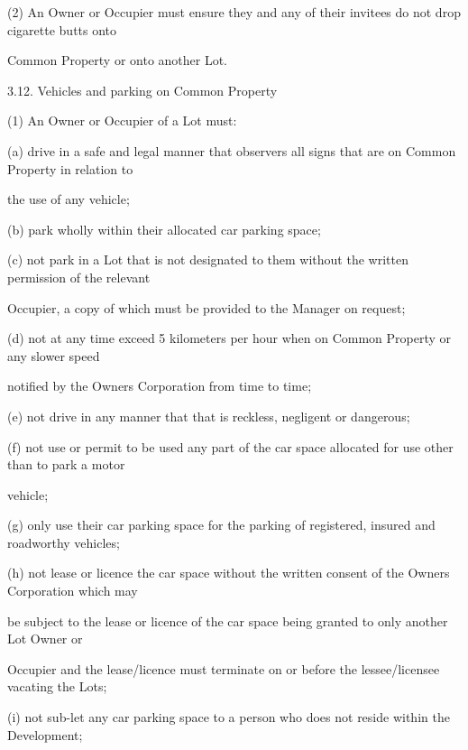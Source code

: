 \documentclass{article}
\begin{document}
{\fontsize{9.962}{1}(2) An Owner or Occupier must ensure they and any of their invitees do not drop cigarette butts onto }

{\fontsize{10.02}{1}Common Property or onto another Lot. }

{\fontsize{9.99}{1}3.12. Vehicles and parking on Common Property }

{\fontsize{9.962}{1}(1) An Owner or Occupier of a Lot must: }

{\fontsize{9.962}{1}(a) drive in a safe and legal manner that observers all signs that are on Common Property in relation to }

{\fontsize{10.02}{1}the use of any vehicle; }

{\fontsize{9.962}{1}(b) park wholly within their allocated car parking space; }

{\fontsize{9.962}{1}(c) not park in a Lot that is not designated to them without the written permission of the relevant }

{\fontsize{10.02}{1}Occupier, a copy of which must be provided to the Manager on request; }

{\fontsize{9.962}{1}(d) not at any time exceed 5 kilometers per hour when on Common Property or any slower speed }

{\fontsize{10.02}{1}notified by the Owners Corporation from time to time; }

{\fontsize{9.962}{1}(e) not drive in any manner that that is reckless, negligent or dangerous; }

{\fontsize{9.962}{1}(f) not use or permit to be used any part of the car space allocated for use other than to park a motor }

{\fontsize{10.02}{1}vehicle; }

{\fontsize{9.962}{1}(g) only use their car parking space for the parking of registered, insured and roadworthy vehicles; }

{\fontsize{9.962}{1}(h) not lease or licence the car space without the written consent of the Owners Corporation which may }

{\fontsize{10.02}{1}be subject to the lease or licence of the car space being granted to only another Lot Owner or }

{\fontsize{10.02}{1}Occupier and the lease/licence must terminate on or before the lessee/licensee vacating the Lots; }

{\fontsize{9.962}{1}(i) not sub-let any car parking space to a person who does not reside within the Development; }
\end{document}
